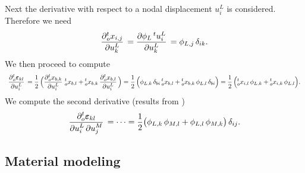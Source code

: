 Next the derivative with respect to a nodal displacement $u_i^L$ is considered. Therefore we need
\begin{equation*}
  \begin{array}{lll}
    \p{{}^t_ox_{i,j}}{u^L_k} = \p{\phi_L\,{}^tu_i^L}{u^L_k} = \phi_{L,j}\,\delta_{ik}.
  \end{array}
\end{equation*}
We then proceed to compute
\begin{equation*}
  \begin{array}{lll}
    \p{{}^t_o\bfeps_{kl}}{u^L_i} = \dfrac12\Big(\p{{}^t_ox_{b,k}}{u^L_i}\,{}^t_ox_{b,l} + {}^t_ox_{b,k}\,\p{{}^t_ox_{b,l}}{u^L_i}\Big) = \dfrac12\Big( \phi_{L,k}\,\delta_{bi} \,{}^t_ox_{b,l} + {}^t_ox_{b,k}\, \phi_{L,l}\,\delta_{bi}\Big) = \dfrac12\Big( {}^t_ox_{i,l}\,\phi_{L,k} + {}^t_ox_{i,k}\, \phi_{L,l}\Big).
  \end{array}
\end{equation*}
We compute the second derivative (results from \cite{SUSSMAN1987357})
\begin{equation*}
  \begin{array}{lll}
   \dfrac{\p ^t_o\bfeps_{kl}}{\p u^L_i\,\p u^M_j} = \dots = \frac12\big(\phi_{L,k}\,\phi_{M,l} + \phi_{L,l}\,\phi_{M,k}\big)\,\delta_{ij}.
  \end{array}
\end{equation*}


\subsection{Material modeling}

